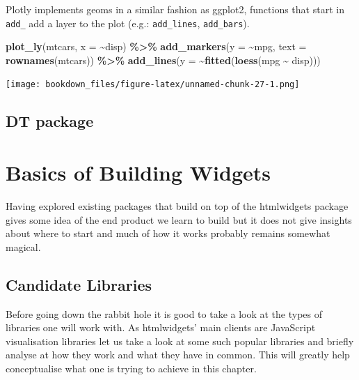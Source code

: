 \documentclass[
]{krantz}
\makeatletter
\newenvironment{Shaded}{\begin{snugshade}}{\end{snugshade}}
\newcommand{\DataTypeTok}[1]{\textcolor[rgb]{0.27,0.27,0.27}{#1}}
\newcommand{\KeywordTok}[1]{\textcolor[rgb]{0.27,0.27,0.27}{\textbf{#1}}}
\newcommand{\NormalTok}[1]{#1}
\newcommand{\OperatorTok}[1]{\textcolor[rgb]{0.43,0.43,0.43}{\textbf{#1}}}
\newcommand{\StringTok}[1]{\textcolor[rgb]{0.5,0.5,0.5}{#1}}
\newenvironment{kframe}{%
\medskip{}
\setlength{\fboxsep}{.8em}
 \def\at@end@of@kframe{}%
 \ifinner\ifhmode%
  \def\at@end@of@kframe{\end{minipage}}%
  \begin{minipage}{\columnwidth}%
 \fi\fi%
 \def\FrameCommand##1{\hskip\@totalleftmargin \hskip-\fboxsep
 \colorbox{shadecolor}{##1}\hskip-\fboxsep
     \hskip-\linewidth \hskip-\@totalleftmargin \hskip\columnwidth}%
 \MakeFramed {\advance\hsize-\width
   \@totalleftmargin\z@ \linewidth\hsize
   \@setminipage}}%
 {\par\unskip\endMakeFramed%
 \at@end@of@kframe}
\renewenvironment{Shaded}{\begin{kframe}}{\end{kframe}}
\makeatother
\begin{document}
Plotly implements geoms in a similar fashion as ggplot2, functions that start in \texttt{add\_} add a layer to the plot (e.g.: \texttt{add\_lines}, \texttt{add\_bars}).

\begin{Shaded}
\begin{Highlighting}[]
\KeywordTok{plot\_ly}\NormalTok{(mtcars, }\DataTypeTok{x =} \OperatorTok{\textasciitilde{}}\NormalTok{disp) }\OperatorTok{\%>\%}\StringTok{ }
\StringTok{  }\KeywordTok{add\_markers}\NormalTok{(}\DataTypeTok{y =} \OperatorTok{\textasciitilde{}}\NormalTok{mpg, }\DataTypeTok{text =} \KeywordTok{rownames}\NormalTok{(mtcars)) }\OperatorTok{\%>\%}\StringTok{ }
\StringTok{  }\KeywordTok{add\_lines}\NormalTok{(}\DataTypeTok{y =} \OperatorTok{\textasciitilde{}}\KeywordTok{fitted}\NormalTok{(}\KeywordTok{loess}\NormalTok{(mpg }\OperatorTok{\textasciitilde{}}\StringTok{ }\NormalTok{disp)))}
\end{Highlighting}
\end{Shaded}

\texttt{[image: bookdown\_files/figure-latex/unnamed-chunk-27-1.png]}

\hypertarget{widgets-intro-dt}{%
\section{DT package}\label{widgets-intro-dt}}

\hypertarget{widgets-basics}{%
\chapter{Basics of Building Widgets}\label{widgets-basics}}

Having explored existing packages that build on top of the htmlwidgets package gives some idea of the end product we learn to build but it does not give insights about where to start and much of how it works probably remains somewhat magical.

\hypertarget{widgets-basics-candidates}{%
\section{Candidate Libraries}\label{widgets-basics-candidates}}

Before going down the rabbit hole it is good to take a look at the types of libraries one will work with. As htmlwidgets' main clients are JavaScript visualisation libraries let us take a look at some such popular libraries and briefly analyse at how they work and what they have in common. This will greatly help conceptualise what one is trying to achieve in this chapter.
\end{document}
